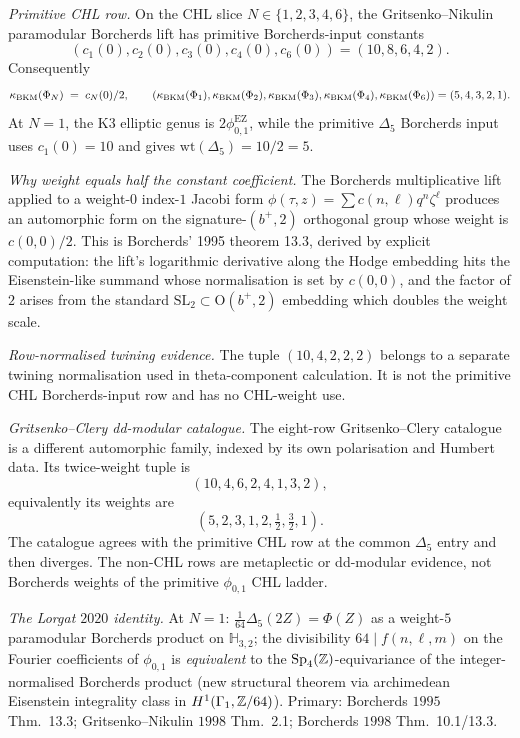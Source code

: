 \begin{theorem}
\label{wn:thm:spine-universal-kBKM}
\emph{Primitive CHL row.} On the CHL slice
$N \in \{1,2,3,4,6\}$, the Gritsenko--Nikulin paramodular Borcherds
lift has primitive Borcherds-input constants
\[
  (c_1(0),c_2(0),c_3(0),c_4(0),c_6(0))
  =
  (10,8,6,4,2).
\]
Consequently
\[
\kappa_{\mathrm{BKM}}(\Phi_N) \;=\; c_N(0)/2,\qquad
(\kappa_{\mathrm{BKM}}(\Phi_1),\kappa_{\mathrm{BKM}}(\Phi_2),\kappa_{\mathrm{BKM}}(\Phi_3),\kappa_{\mathrm{BKM}}(\Phi_4),\kappa_{\mathrm{BKM}}(\Phi_6))
= (5,4,3,2,1).
\]
At $N=1$, the K3 elliptic genus is $2\phi_{0,1}^{\mathrm{EZ}}$, while
the primitive $\Delta_5$ Borcherds input uses $c_1(0)=10$ and gives
$\mathrm{wt}(\Delta_5)=10/2=5$.

\emph{Why weight equals half the constant coefficient.} The Borcherds
multiplicative lift applied to a weight-$0$ index-$1$ Jacobi form
$\phi(\tau, z) = \sum c(n, \ell) q^n \zeta^\ell$ produces an
automorphic form on the signature-$(b^+, 2)$ orthogonal group whose
weight is $c(0,0)/2$.  This is Borcherds' 1995 theorem 13.3, derived
by explicit computation: the lift's logarithmic derivative along the
Hodge embedding hits the Eisenstein-like summand whose normalisation
is set by $c(0,0)$, and the factor of $2$ arises from the standard
$\mathrm{SL}_2 \subset \mathrm{O}(b^+, 2)$ embedding which doubles the
weight scale.

\emph{Row-normalised twining evidence.} The tuple $(10,4,2,2,2)$
belongs to a separate twining normalisation used in theta-component
calculation.  It is not the primitive CHL Borcherds-input row and has
no CHL-weight use.

\emph{Gritsenko--Clery dd-modular catalogue.} The eight-row
Gritsenko--Clery catalogue is a different automorphic family, indexed
by its own polarisation and Humbert data.  Its twice-weight tuple is
\[
  (10,4,6,2,4,1,3,2),
\]
equivalently its weights are
\[
  (5,2,3,1,2,\tfrac12,\tfrac32,1).
\]
The catalogue agrees with the primitive CHL row at the common
$\Delta_5$ entry and then diverges.  The non-CHL rows are metaplectic
or dd-modular evidence, not Borcherds weights of the primitive
$\phi_{0,1}$ CHL ladder.

\emph{The Lorgat $2020$ identity.} At $N = 1$:
$\frac{1}{64}\Delta_5(2Z) = \Phi(Z)$ as a weight-$5$ paramodular
Borcherds product on $\mathbb{H}_{3,2}$; the divisibility
$64 \mid f(n, \ell, m)$ on the Fourier coefficients of $\phi_{0,1}$ is
\emph{equivalent} to the $\mathrm{Sp}_4(\mathbb{Z})$-equivariance of the
integer-normalised Borcherds product (new structural theorem via
archimedean Eisenstein integrality class in $H^1(\Gamma_1, \mathbb{Z}/64)$).
Primary: Borcherds $1995$ Thm.~13.3; Gritsenko--Nikulin $1998$
Thm.~2.1; Borcherds $1998$ Thm.~10.1/13.3.
\end{theorem}


